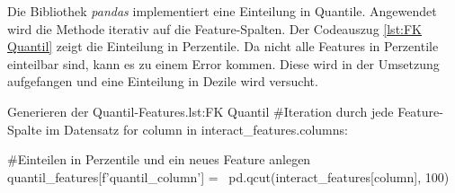 Die Bibliothek \textit{pandas} implementiert eine Einteilung in Quantile. Angewendet wird die Methode iterativ auf die Feature-Spalten. Der Codeauszug \ref{lst:FK Quantil} zeigt die Einteilung in Perzentile. Da nicht alle Features in Perzentile einteilbar sind, kann es zu einem Error kommen. Diese wird in der Umsetzung aufgefangen und eine Einteilung in Dezile wird versucht. 
        
\begin{pythoncode}{Generieren der Quantil-Features.}{lst:FK Quantil}
#Iteration durch jede Feature-Spalte im Datensatz
for column in interact_features.columns:

    #Einteilen in Perzentile und ein neues Feature anlegen
    quantil_features[f'quantil_{column}'] = \ 
        pd.qcut(interact_features[column], 100)
\end{pythoncode}


